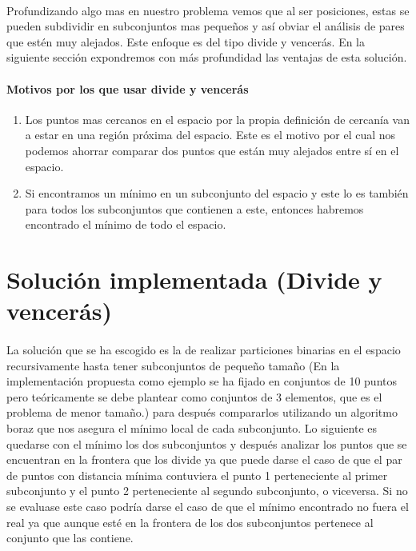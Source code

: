 \documentclass{article}
\begin{document}
	
		\paragraph{}
		Profundizando algo mas en nuestro problema vemos que al ser posiciones, estas se pueden subdividir en subconjuntos mas pequeños y así obviar el análisis de pares que estén muy alejados. Este enfoque es del tipo divide y vencerás. En la siguiente sección expondremos con más profundidad las ventajas de esta solución.

		\paragraph{Motivos por los que usar divide y vencerás}

			\begin{enumerate}

				\item
				Los puntos mas cercanos en el espacio por la propia definición de cercanía van a estar en una región próxima del espacio. Este es el motivo por el cual nos podemos ahorrar comparar dos puntos que están muy alejados entre sí en el espacio.
				
				\item
				Si encontramos un mínimo en un subconjunto del espacio y este lo es también para todos los subconjuntos que contienen a este, entonces habremos encontrado el mínimo de todo el espacio.

			\end{enumerate}

\section{Solución implementada (Divide y vencerás)}

	\paragraph{}
	La solución que se ha escogido es la de realizar particiones binarias en el espacio recursivamente hasta tener subconjuntos de pequeño tamaño (En la implementación propuesta como ejemplo se ha fijado en conjuntos de 10 puntos pero teóricamente se debe plantear como conjuntos de 3 elementos, que es el problema de menor tamaño.) para después compararlos utilizando un algoritmo boraz que nos asegura el mínimo local de cada subconjunto. Lo siguiente es quedarse con el mínimo los dos subconjuntos y después analizar los puntos que se encuentran en la frontera que los divide ya que puede darse el caso de que el par de puntos con distancia mínima contuviera el punto 1 perteneciente al primer subconjunto y el punto 2 perteneciente al segundo subconjunto, o viceversa. Si no se evaluase este caso podría darse el caso de que el mínimo encontrado no fuera el real ya que aunque esté en la frontera de los dos subconjuntos pertenece al conjunto que las contiene.
	
\end{document}
